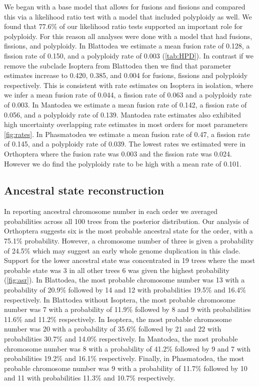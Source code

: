 We began with a base model that allows for fusions and fissions and compared this via a likelihood ratio test with a model that included polyploidy as well.
We found that 77.6\% of our likelihood ratio tests supported an important role for polyploidy.
For this reason all analyses were done with a model that had fusions, fissions, and polyploidy.
In Blattodea we estimate a mean fusion rate of 0.128, a fission rate of 0.150, and a polyploidy rate of 0.003 (\cref{tab:HPD}).
In contrast if we remove the subclade Isoptera from Blattodea then we find that parameter estimates increase to 0.420, 0.385, and 0.004 for fusions, fissions and polyploidy respectively.
This is consistent with rate estimates on Isoptera in isolation, where we infer a mean fusion rate of 0.044, a fission rate of 0.063 and a polyploidy rate of 0.003.
In Mantodea we estimate a mean fusion rate of 0.142, a fission rate of 0.056, and a polyploidy rate of 0.139.
Mantodea rate estimates also exhibited high uncertainty overlapping rate estimates in most orders for most parameters \cref{fig:rates}.
In Phasmatodea we estimate a mean fusion rate of 0.47, a fission rate of 0.145, and a polyploidy rate of 0.039.
The lowest rates we estimated were in Orthoptera where the fusion rate was 0.003 and the fission rate was 0.024. However we do find the polyploidy rate to be high with a mean rate of 0.101.

\subsection{Ancestral state reconstruction}
In reporting ancestral chromosome number in each order we averaged probabilities across all 100 trees from the posterior distribution. 
Our analysis of Orthoptera suggests six is the most probable ancestral state for the order, with a 75.1\% probability.
However, a chromosome number of three is given a probability of 24.5\% which may suggest an early whole genome duplication in this clade.
Support for the lower ancestral state was concentrated in 19 trees where the most probable state was 3 in all other trees 6 was given the highest probability (\cref{fig:asr}). 
In Blattodea, the most probable chromosome number was 13 with a probability of 20.9\% followed by 14 and 12 with probabilities 19.5\% and 16.4\% respectively. 
In Blattodea without Isoptera, the most probable chromosome number was 7 with a probability of 11.9\% followed by 8 and 9 with probabilities 11.6\% and 11.2\% respectively.
In Isoptera, the most probable chromosome number was 20 with a probability of 35.6\% followed by 21 and 22 with probabilities 30.7\% and 14.0\% respectively.
In Mantodea, the most probable chromosome number was 8 with a probability of 41.2\% followed by 9 and 7 with probabilities 19.2\% and 16.1\% respectively.
Finally, in Phasmatodea, the most probable chromosome number was 9 with a probability of 11.7\% followed by 10 and 11 with probabilities 11.3\% and 10.7\% respectively.


